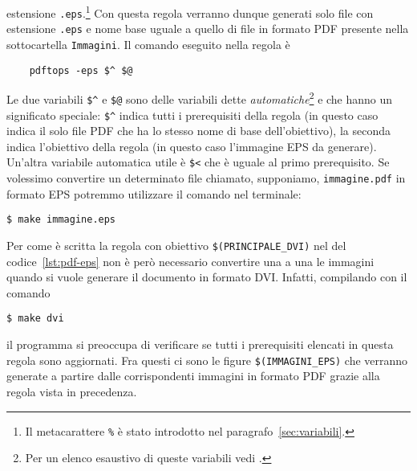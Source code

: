 estensione
\texttt{.eps}.\footnote{Il metacarattere \texttt{\%} è stato introdotto nel
  paragrafo~\ref{sec:variabili}.}
Con questa regola verranno dunque generati solo file con estensione
\texttt{.eps} e nome base uguale a quello di file in formato \textsc{PDF}
presente nella sottocartella \texttt{Immagini}.  Il comando eseguito nella
regola è
\begin{lstlisting}
	pdftops -eps $^ $@
\end{lstlisting}
Le due variabili \texttt{\$\^} e \texttt{\$@} sono delle variabili dette
\emph{automatiche}\footnote{Per un elenco esaustivo di queste variabili vedi
  \cite[pagina 112]{gnu:make}.}
e che hanno un significato speciale: \texttt{\$\^} indica tutti i prerequisiti
della regola (in questo caso indica il solo file \textsc{PDF} che ha lo stesso
nome di base dell'obiettivo), la seconda indica l'obiettivo della regola (in
questo caso l'immagine \textsc{EPS} da generare).  Un'altra variabile automatica
utile è \texttt{\$<} che è uguale al primo prerequisito.  Se volessimo
convertire un determinato file chiamato, supponiamo, \texttt{immagine.pdf} in
formato \textsc{EPS} potremmo utilizzare il comando nel terminale:
\begin{verbatim}
$ make immagine.eps
\end{verbatim}
Per come è scritta la regola con obiettivo \texttt{\$(PRINCIPALE\_DVI)} nel
 del codice~\ref{lst:pdf-eps} non è però necessario
convertire una a una le immagini quando si vuole generare il documento in
formato \textsc{DVI}.  Infatti, compilando con il comando
\begin{verbatim}
$ make dvi
\end{verbatim}
il programma  si preoccupa di verificare se tutti i prerequisiti
elencati in questa regola sono aggiornati.  Fra questi ci sono le figure
\texttt{\$(IMMAGINI\_EPS)} che verranno generate a partire dalle corrispondenti
immagini in formato \textsc{PDF} grazie alla regola vista in precedenza.

